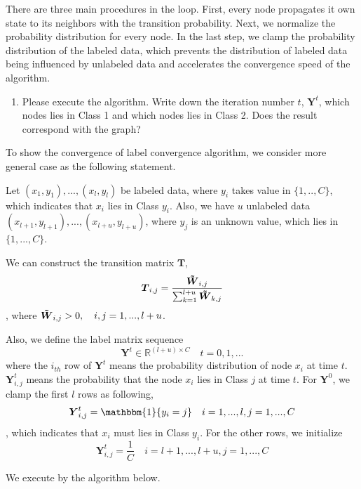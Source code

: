\documentclass{article}
\begin{document}
\newpage
There are three main procedures in the loop. First, every node propagates it own state to its neighbors with the transition probability. Next, we normalize the probability distribution for every node. In the last step, we clamp the probability distribution of the labeled data, which prevents the distribution of labeled data being influenced by unlabeled data and accelerates the convergence speed of the algorithm.
\begin{enumerate}[resume]
\item Please execute the algorithm. Write down the iteration number $t$, $\boldsymbol{Y}^{t}$, which nodes lies in Class 1 and which nodes lies in Class 2. Does the result correspond with the graph?
\end{enumerate}

To show the convergence of label convergence algorithm, we consider more general case as the following statement.

Let $(x_1, y_1),...,(x_l,y_l)$ be labeled data, where $y_i$ takes value in $ \{ 1,..,C \} $, which indicates that $x_i$ lies in Class $y_i$. Also, we have $u$ unlabeled data  $(x_{l+1}, y_{l+1}),...,(x_{l+u},y_{l+u})$, where $y_j$ is an unknown value, which lies in $\{ 1,...,C \}$. 

We can construct the transition matrix $\boldsymbol{T}$,
$$\boldsymbol{T}_{i,j} = \frac{\boldsymbol{\Tilde{W}}_{i,j}}{\sum_{k=1}^{l+u} \boldsymbol{\Tilde{W}}_{k,j}}$$,
where $\boldsymbol{\Tilde{W}}_{i,j} > 0, \quad i,j = 1,..., l+u$.

Also, we define the label matrix sequence $$\boldsymbol{Y}^t \in \mathbb{R}^{(l+u) \times C} \quad t=0,1,...$$ where the $i_{th}$ row of $\boldsymbol{Y}^t$ means the probability distribution of node $x_i$ at time $t$. $\boldsymbol{Y}^t_{i,j}$ means the probability that the node $x_i$ lies in Class $j$ at time $t$. For $\boldsymbol{Y}^0$, we clamp the first $l$ rows as following,
$$\boldsymbol{Y}^{t}_{i,j}= \mathbbm{1}\{y_i=j\} \quad i = 1,...,l, j = 1,...,C$$,
which indicates that $x_i$ must lies in Class $y_i$. For the other rows, we initialize
$$\boldsymbol{Y}^{t}_{i,j}= \frac{1}{C} \quad i = l+1,...,l+u, j = 1,...,C$$

We execute by the algorithm below.
\end{document}
